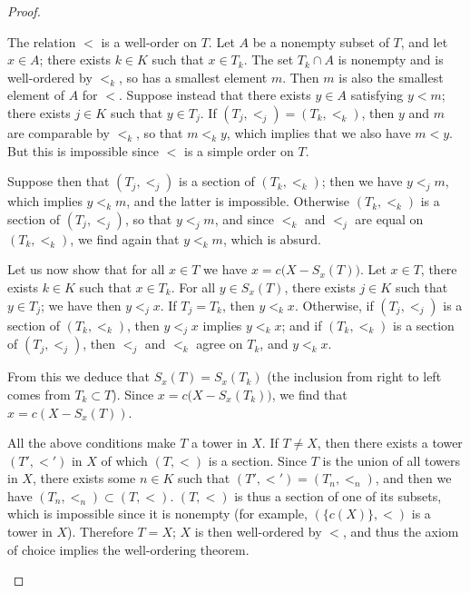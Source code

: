 \documentclass[11pt,a4paper,twoside]{article}
\theoremstyle{definition}
\theoremstyle{plain}
\begin{document}
\begin{proof}
\begin{enumerate}[(a)]
    The relation $<$ is a well-order on $T$. Let $A$ be a nonempty subset of $T$, and let
    $x \in A$; there exists $k \in K$ such that $x \in T_k$. The set $T_k \cap A$ is nonempty
    and is well-ordered by $<_k$, so has a smallest element $m$. Then $m$ is also the smallest
    element of $A$ for $<$. Suppose instead that there exists $y \in A$ satisfying $y < m$;
    there exists $j \in K$ such that $y \in T_j$. If $( T_j, <_j ) = ( T_k, <_k )$, then $y$
    and $m$ are comparable by $<_k$, so that $m <_k y$, which implies that we also have $m < y$.
    But this is impossible since $<$ is a simple order on $T$.

    Suppose then that $( T_j, <_j )$ is a section of $( T_k, <_k )$; then we have $y <_j m$, which
    implies $y <_k m$, and the latter is impossible. Otherwise $( T_k, <_k )$ is a section of
    $( T_j, <_j )$, so that $y <_j m$, and since $<_k$ and $<_j$ are equal on $( T_k, <_k )$,
    we find again that $y <_k m$, which is absurd.

    Let us now show that for all $x \in T$ we have $x = c \big( X - S_x ( T ) \big)$.
    Let $x \in T$, there exists $k \in K$ such that $x \in T_k$. For all $y \in S_x ( T )$,
    there exists $j \in K$ such that $y \in T_j$; we have then $y <_j x$. If $T_j = T_k$,
    then $y <_k x$. Otherwise, if $( T_j, <_j )$ is a section of $( T_k, <_k )$, then
    $y <_j x$ implies $y <_k x$; and if $( T_k, <_k )$ is a section of $( T_j, <_j )$,
    then $<_j$ and $<_k$ agree on $T_k$, and $y <_k x$.

    From this we deduce that $S_x ( T ) = S_x ( T_k )$ (the inclusion from right to left
    comes from $T_k \subset T$). Since $x = c \big( X - S_x ( T_k ) \big)$, we find
    that $x = c \left( X - S_x ( T ) \right)$.

    All the above conditions make $T$ a tower in $X$. If $T \neq X$, then there exists
    a tower $( T', <' )$ in $X$ of which $( T, < )$ is a section. Since $T$ is the union
    of all towers in $X$, there exists some $n \in K$ such that $( T', <' ) = ( T_n, <_n )$,
    and then we have $( T_n, <_n ) \subset ( T, < )$. $( T, < )$ is thus a section of
    one of its subsets, which is impossible since it is nonempty (for example, $( \{ c ( X ) \}, < )$ is
    a tower in $X$). Therefore $T = X$; $X$ is then well-ordered by $<$, and thus the axiom of choice
    implies the well-ordering theorem.


\end{enumerate}
\end{proof}
\end{document}
